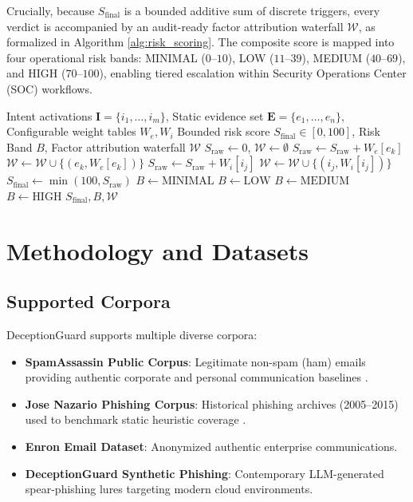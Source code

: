 \documentclass{ieeeaccess}
\begin{document}
Crucially, because $S_{\text{final}}$ is a bounded additive sum of discrete triggers, every verdict is accompanied by an audit-ready factor attribution waterfall $\mathcal{W}$, as formalized in Algorithm \ref{alg:risk_scoring}. The composite score is mapped into four operational risk bands: MINIMAL ($0$--$10$), LOW ($11$--$39$), MEDIUM ($40$--$69$), and HIGH ($70$--$100$), enabling tiered escalation within Security Operations Center (SOC) workflows.

\begin{algorithm}[!t]
\caption{Bounded Additive Risk Scoring and Factor Attribution}
\label{alg:risk_scoring}
\begin{algorithmic}[1]
\REQUIRE Intent activations $\mathbf{I} = \{i_1, \dots, i_m\}$, Static evidence set $\mathbf{E} = \{e_1, \dots, e_n\}$, Configurable weight tables $W_e, W_i$
\ENSURE Bounded risk score $S_{\text{final}} \in [0, 100]$, Risk Band $B$, Factor attribution waterfall $\mathcal{W}$
\STATE $S_{\text{raw}} \leftarrow 0$, $\mathcal{W} \leftarrow \emptyset$
    \STATE $S_{\text{raw}} \leftarrow S_{\text{raw}} + W_e[e_k]$
    \STATE $\mathcal{W} \leftarrow \mathcal{W} \cup \{(e_k, W_e[e_k])\}$
\ENDFOR
{}
    \STATE $S_{\text{raw}} \leftarrow S_{\text{raw}} + W_i[i_j]$
    \STATE $\mathcal{W} \leftarrow \mathcal{W} \cup \{(i_j, W_i[i_j])\}$
\ENDFOR
\STATE $S_{\text{final}} \leftarrow \min(100, S_{\text{raw}})$
    \STATE $B \leftarrow \text{MINIMAL}$
    \STATE $B \leftarrow \text{LOW}$
    \STATE $B \leftarrow \text{MEDIUM}$
\ELSE
    \STATE $B \leftarrow \text{HIGH}$
\ENDIF
\RETURN $S_{\text{final}}, B, \mathcal{W}$
\end{algorithmic}
\end{algorithm}

\section{Methodology and Datasets}
\label{sec:methodology}

\subsection{Supported Corpora}
DeceptionGuard supports multiple diverse corpora:
\begin{itemize}
    \item \textbf{SpamAssassin Public Corpus}: Legitimate non-spam (ham) emails providing authentic corporate and personal communication baselines \cite{b4}.
    \item \textbf{Jose Nazario Phishing Corpus}: Historical phishing archives (2005--2015) used to benchmark static heuristic coverage \cite{b3}.
    \item \textbf{Enron Email Dataset}: Anonymized authentic enterprise communications.
    \item \textbf{DeceptionGuard Synthetic Phishing}: Contemporary LLM-generated spear-phishing lures targeting modern cloud environments.
\end{itemize}
\end{document}
